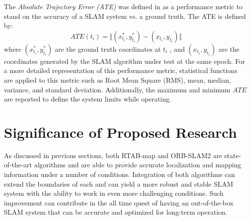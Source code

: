 \documentclass[12pt]{article}
\begin{document}
The \textit{Absolute Trajectory Error (ATE)} was defined in \cite{8710464} as a performance metric to stand on the accuracy of a SLAM system vs. a ground truth. The ATE is defined by:
\begin{equation}
ATE(t_i) = \Vert (x_{t_i}^*,y_{t_i}^*) - (x_{t_i},y_{t_i}) \Vert
\end{equation}
where $(x_{t_i}^*,y_{t_i}^*)$ are the ground truth coordinates at $t_i$ , and $(x_{t_i},y_{t_i})$ are the coordinates generated by the SLAM algorithm under test at the same epoch. For a more detailed representation of this performance metric, statistical functions are applied to this metric such as Root Mean Square (RMS), mean, median, variance, and standard deviation. Additionally, the maximum and minimum $ATE$ are reported to define the system limits while operating. 
\section{Significance of Proposed Research}
As discussed in previous sections, both RTAB-map and ORB-SLAM2 are state-of-the-art algorithms and are able to provide accurate localization and mapping information under a number of conditions. Integration of both algorithms can extend the boundaries of each and can yield a more robust and stable SLAM system with the ability to work in even more challenging conditions. Such improvement can contribute in the all time quest of having an out-of-the-box SLAM system \cite{cadena2016past} that can be accurate and optimized for long-term operation.

\newpage
\pagestyle{style2}


 
\end{document}

